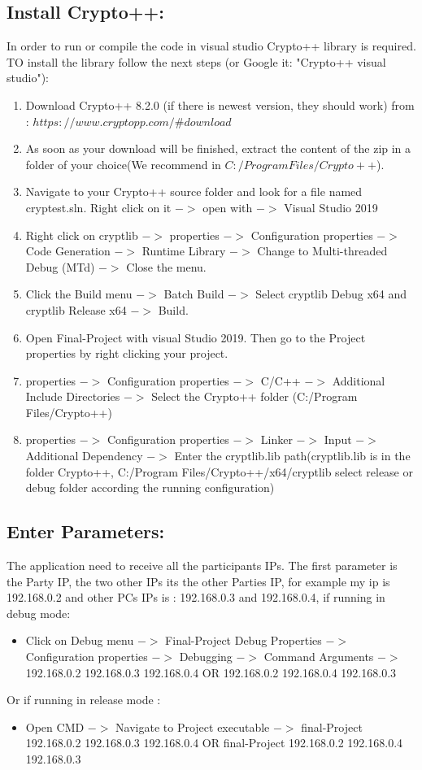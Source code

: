 \documentclass[12pt]{article}
\begin{document}
\subsection{Install Crypto++:}
In order to run or compile the code in visual studio Crypto++ library is required. TO install the library follow the next steps (or Google it: "Crypto++ visual studio"):
\begin{enumerate}
	\item Download Crypto++ 8.2.0 (if there is newest version, they should work) from : $https://www.cryptopp.com/\#download$
	\item As soon as your download will be finished, extract the content of the zip in a folder of your choice(We recommend in $C:/Program Files/Crypto++$).
	\item Navigate to your Crypto++ source folder and look for a file named cryptest.sln. Right click on it $->$ open with $->$ Visual Studio 2019

\item Right click on cryptlib $->$ properties $->$ Configuration properties $->$ Code Generation $->$ Runtime Library $->$ Change to Multi-threaded Debug (MTd) $->$ Close the menu.
\item Click the Build menu $->$ Batch Build $->$ Select cryptlib Debug x64 and cryptlib Release x64 $->$ Build.
\item Open Final-Project with visual Studio 2019. Then go to the Project properties by right clicking your project.
\item properties $->$ Configuration properties $->$  C/C++ $->$ Additional Include Directories $->$ Select the Crypto++ folder (C:/Program Files/Crypto++)
\item properties $->$ Configuration properties $->$ Linker $->$ Input $->$ Additional Dependency $->$ Enter the cryptlib.lib path(cryptlib.lib is in the folder Crypto++, C:/Program Files/Crypto++/x64/cryptlib select release or debug folder according the running configuration)
\end{enumerate}
\subsection{Enter Parameters:}
The application need to receive all the participants IPs.
The first parameter is the Party IP, the two other IPs its the other Parties IP, for example my ip is 192.168.0.2 and other PCs IPs is : 192.168.0.3 and 192.168.0.4, if running in debug mode:
\begin{itemize}
\item Click on Debug menu $->$ Final-Project Debug Properties $->$Configuration properties $->$ Debugging $->$ Command  Arguments $->$  192.168.0.2 192.168.0.3 192.168.0.4 OR 192.168.0.2 192.168.0.4 192.168.0.3
\end{itemize}
Or if running in release mode :
\begin{itemize}
\item Open CMD $->$ Navigate to Project executable $->$ final-Project 192.168.0.2 192.168.0.3 192.168.0.4 OR final-Project 192.168.0.2 192.168.0.4 192.168.0.3
\end{itemize}
\pagebreak
\end{document}
